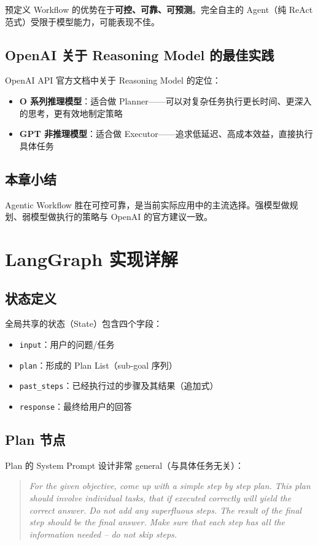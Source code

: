 \documentclass[a4paper]{article}
\begin{document}
预定义 Workflow 的优势在于\textbf{可控、可靠、可预测}。完全自主的 Agent（纯 ReAct 范式）受限于模型能力，可能表现不佳。

\subsection{OpenAI 关于 Reasoning Model 的最佳实践}

OpenAI API 官方文档中关于 Reasoning Model 的定位：
\begin{itemize}
    \item \textbf{O 系列推理模型}：适合做 Planner——可以对复杂任务执行更长时间、更深入的思考，更有效地制定策略
    \item \textbf{GPT 非推理模型}：适合做 Executor——追求低延迟、高成本效益，直接执行具体任务
\end{itemize}

\subsection{本章小结}

Agentic Workflow 胜在可控可靠，是当前实际应用中的主流选择。强模型做规划、弱模型做执行的策略与 OpenAI 的官方建议一致。

\section{LangGraph 实现详解}

\subsection{状态定义}

全局共享的状态（State）包含四个字段：
\begin{itemize}
    \item \texttt{input}：用户的问题/任务
    \item \texttt{plan}：形成的 Plan List（sub-goal 序列）
    \item \texttt{past\_steps}：已经执行过的步骤及其结果（追加式）
    \item \texttt{response}：最终给用户的回答
\end{itemize}

\subsection{Plan 节点}

Plan 的 System Prompt 设计非常 general（与具体任务无关）：
\begin{quote}
\textit{For the given objective, come up with a simple step by step plan. This plan should involve individual tasks, that if executed correctly will yield the correct answer. Do not add any superfluous steps. The result of the final step should be the final answer. Make sure that each step has all the information needed -- do not skip steps.}
\end{quote}
\end{document}
